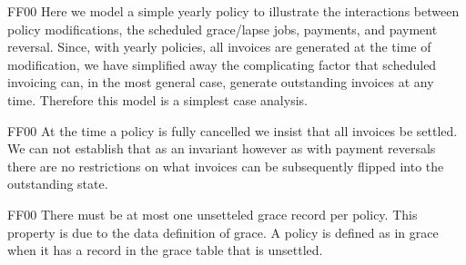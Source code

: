\tlatex
{}
 \@x{}\moduleLeftDash{}\moduleRightDash\@xx{}%
%
%
\@pvspace{8.0pt}%
%
\@pvspace{8.0pt}%
\begin{lcom}{7.5}%
\begin{cpar}{0}{F}{F}{0}{0}{}%
 Here we model a simple yearly policy to illustrate the interactions between
 policy
 modifications, the scheduled grace/lapse jobs, payments, and payment
 reversal. Since,
 with yearly policies, all invoices are generated at the time of
 modification, we have
 simplified away the complicating factor that scheduled invoicing can, in the
 most general
 case, generate outstanding invoices at any time. Therefore this model is a
 simplest case
 analysis.
\end{cpar}%
\end{lcom}%
\@x{}\midbar\@xx{}%
\@x{}%
%
\@xx{}%
%
%
%
\@pvspace{8.0pt}%
\begin{lcom}{7.5}%
\begin{cpar}{0}{F}{F}{0}{0}{}%
 At the time a policy is fully cancelled we insist that all invoices be
 settled. We
 can not establish that as an invariant however as with payment reversals
 there are no
 restrictions on what invoices can be subsequently flipped into the
 outstanding state.
\end{cpar}%
\end{lcom}%
%
\@pvspace{8.0pt}%
\begin{lcom}{7.5}%
\begin{cpar}{0}{F}{F}{0}{0}{}%
 There must be at most one unsetteled grace record per policy. This property
 is due to
 the data definition of grace. A policy is defined as in grace when it has a
 record
 in the grace table that is unsettled.
\end{cpar}%
\end{lcom}%
